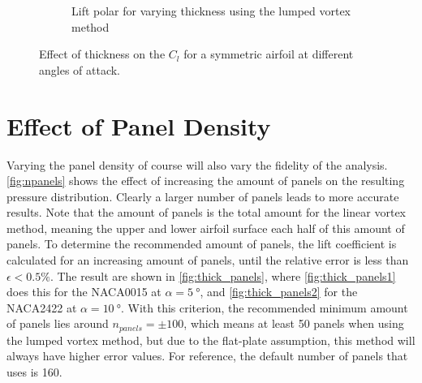 \begin{figure}[h]
\begin{subfigure}{.5\textwidth}
    \caption{\centering Lift polar for varying thickness using the lumped vortex method}
    \label{fig:thin_tc_cla}
  \end{subfigure}
  \caption{\centering Effect of thickness on the $C_l$ for a symmetric airfoil at different angles of attack.}
  \label{fig:tc_cla}
\end{figure}


\section{Effect of Panel Density}
\label{sec:panels}
Varying the panel density of course will also vary the fidelity of the analysis.
\autoref{fig:npanels} shows the effect of increasing the amount of panels on the
resulting pressure distribution. Clearly a larger number of panels leads to more
accurate results. Note that the amount of panels is the total amount for the
linear vortex method, meaning the upper and lower airfoil surface each half of
this amount of panels. To determine the recommended amount of panels, the lift
coefficient is calculated for an increasing amount of panels, until the relative
error is less than $\epsilon < 0.5\%$. The result are shown in
\cref{fig:thick_panels}, where \cref{fig:thick_panels1} does this for the
NACA0015 at $\alpha=\SI{5}{\degree}$, and \cref{fig:thick_panels2} for the
NACA2422 at $\alpha=\SI{10}{\degree}$. With this criterion, the recommended
minimum amount of panels lies around $n_{panels} = \pm 100$, which means at least 50
panels when using the lumped vortex method, but due to the flat-plate
assumption, this method will always have higher error values. For reference, the
default number of panels that \xfoil uses is 160.


